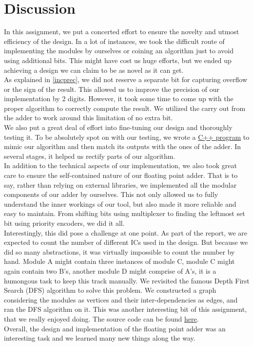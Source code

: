 \documentclass[12pt]{article}
\begin{document}
\section{\large{Discussion}}
In this assignment, we put a concerted effort to ensure the novelty and utmost efficiency of the design. In a lot of instances, we took the difficult route of implementing the modules by ourselves or coining an algorithm just to avoid using additional bits. This might have cost us huge efforts, but we ended up achieving a design we can claim to be as novel as it can get. \\
\newline
As explained in \ref{incprec}, we did not reserve a separate bit for capturing overflow or the sign of the result. This allowed us to improve the precision of our implementation by 2 digits. However, it took some time to come up with the proper algorithm to correctly compute the result. We utilized the carry out from the adder to work around this limitation of no extra bit.\\
\newline
We also put a great deal of effort into fine-tuning our design and thoroughly testing it. To be absolutely spot on with our testing, we wrote a \href{https://github.com/risenfromashes/cse306/blob/master/FPA/Tester/FPA.cpp}{C++ program} to mimic our algorithm and then match its outputs with the ones of the adder. In several stages, it helped us rectify parts of our algorithm.\\
\newline
In addition to the technical aspects of our implementation, we also took great care to ensure the self-contained nature of our floating point adder. That is to say, rather than relying on external libraries, we implemented all the modular components of our adder by ourselves. This not only allowed us to fully understand the inner workings of our tool, but also made it more reliable and easy to maintain. From shifting bits using multiplexer to finding the leftmost set bit using priority encoders, we did it all. \\
\newline
Interestingly, this did pose a challenge at one point. As part of the report, we are expected to count the number of different ICs used in the design. But because we did so many abstractions, it was virtually impossible to count the number by hand. Module A might contain three instances of module C, module C might again contain two B’s, another module D might comprise of A’s, it is a humongous task to keep this track manually. We revisited the famous Depth First Search (DFS) algorithm to solve this problem. We constructed a graph considering the modules as vertices and their inter-dependencies as edges, and ran the DFS algorithm on it. This was another interesting bit of this assignment, that we really enjoyed doing. The source code can be found \href{https://github.com/risenfromashes/cse306/blob/master/FPA/Tester/ic_counter.cc}{here}. \\
\newline
Overall, the design and implementation of the floating point adder was an interesting task and we learned many new things along the way.\\
\end{document}
